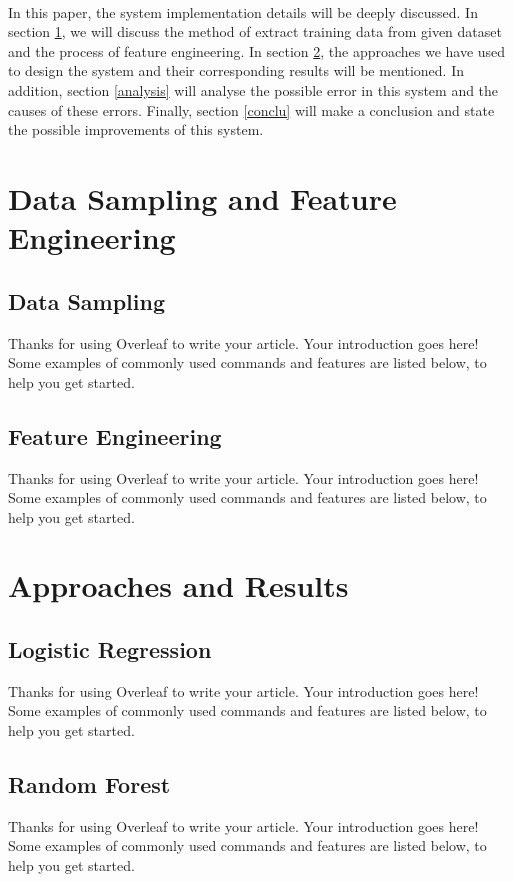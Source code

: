 \documentclass[fleqn,11pt]{olplainarticle}
\begin{document}
\paragraph*{}
In this paper, the system implementation details will be deeply discussed. In section \ref{datafeature}, we will discuss the method of extract training data from given dataset and the process of feature engineering. In section \ref{appres}, the approaches we have used to design the system and their corresponding results will be mentioned. In addition, section \ref{analysis} will analyse the possible error in this system and the causes of these errors. Finally, section \ref{conclu} will make a conclusion and state the possible improvements of this system.



\section{Data Sampling and Feature Engineering}\label{datafeature}

\subsection{Data Sampling}\label{data}
Thanks for using Overleaf to write your article. Your introduction goes here! Some examples of commonly used commands and features are listed below, to help you get started.

\subsection{Feature Engineering}\label{feature}
Thanks for using Overleaf to write your article. Your introduction goes here! Some examples of commonly used commands and features are listed below, to help you get started.

\section{Approaches and Results}\label{appres}

\subsection{Logistic Regression}\label{lr}
Thanks for using Overleaf to write your article. Your introduction goes here! Some examples of commonly used commands and features are listed below, to help you get started.

\subsection{Random Forest}\label{random}
Thanks for using Overleaf to write your article. Your introduction goes here! Some examples of commonly used commands and features are listed below, to help you get started.
\end{document}
